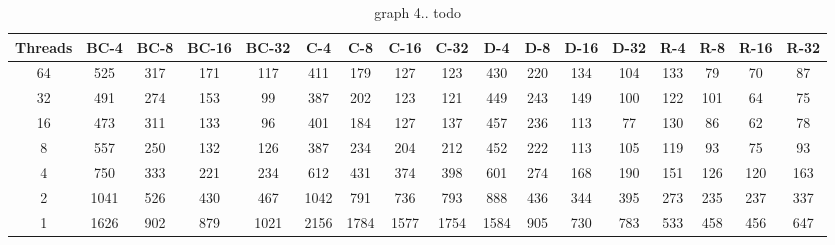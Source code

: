 %
\begin{table}
\label{tab:graph4}
\caption{graph 4.. todo}
{\small
\begin{tabular}{||c||c|c|c|c||c|c|c|c||c|c|c|c||c|c|c|c|}
\hline
\textbf{Threads}	&\cellcolor{black!10}BC-4&	\cellcolor{black!10}BC-8	&\cellcolor{black!10}BC-16	&\cellcolor{black!10}BC-32&	\cellcolor{black!10}C-4	&\cellcolor{black!10}C-8&	\cellcolor{black!10}C-16&	\cellcolor{black!10}C-32&	\cellcolor{black!10}D-4&	\cellcolor{black!10}D-8	&\cellcolor{black!10}D-16&\cellcolor{black!10}	D-32&	\cellcolor{black!10}R-4	&\cellcolor{black!10}R-8&	\cellcolor{black!10}R-16&	\cellcolor{black!10}R-32 \\ \hline \hline
64 &		525&	317	&171&	117	&411	&179&	127	&123	&430	&220	&134	&104&	133&	79&	70	&87	 \\ \hline		
32	&	491&	274	&153	&99	&387	&202	&123	&121 &449	&243&	149&	100	&122	&101&	64&	75\\ \hline
16	&	473	&311	&133	&96	&401	&184	&127	&137 &457	&236	&113	&77	&130	&86	&62	&78 \\ \hline
8	&	557&	250	&132	&126	&387	&234	&204	&212 &452	&222	&113	&105	&119&	93	&75	&93 \\ \hline
4		&750&	333	&221	&234	&612	&431	&374	&398 &601	&274 &168	&190	&151	&126&	120	&163 \\ \hline
2		&1041 &526 &430 &467	&1042	&791	&736	&793 &888	&436	&344	&395	&273	&235	&237	&337 \\ \hline
1		&1626&902&879 &1021 &2156 &1784 &1577 &1754 &1584 &905 &730 &783& 533 &458 &456 &647 \\ \hline
\end{tabular}
}
\end{table}
\twocolumngrid

